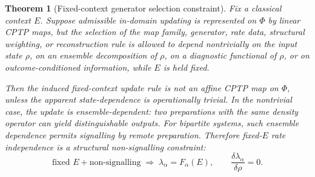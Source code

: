\documentclass[aps,prx,onecolumn,11pt]{revtex4-2}
\theoremstyle{plain}
\newtheorem{theorem}{Theorem}
\theoremstyle{definition}
\theoremstyle{remark}
\begin{document}
\begin{theorem}[Fixed-context generator selection constraint]
\label{thm:fixed_context_generator_selection}
Fix a classical context \(E\). Suppose admissible in-domain updating is
represented on \(\Phi\) by linear CPTP maps, but the selection of the
map family, generator, rate data, structural weighting, or
reconstruction rule is allowed to depend nontrivially on the input state
\(\rho\), on an ensemble decomposition of \(\rho\), on a diagnostic
functional of \(\rho\), or on outcome-conditioned information, while
\(E\) is held fixed.

Then the induced fixed-context update rule is not an affine CPTP map on
\(\Phi\), unless the apparent state-dependence is operationally
trivial. In the nontrivial case, the update is ensemble-dependent: two
preparations with the same density operator can yield distinguishable
outputs. For bipartite systems, such ensemble dependence permits
signalling by remote preparation. Therefore fixed-\(E\) rate
independence is a structural non-signalling constraint:
\[
\boxed{
\text{fixed }E+\text{non-signalling}
\;\Longrightarrow\;
\lambda_\alpha=F_\alpha(E),
\qquad
\frac{\delta\lambda_\alpha}{\delta\rho}=0.
}
\]
\end{theorem}
\end{document}
